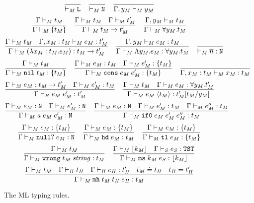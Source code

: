\begin{figure}[p]
\caption{The ML typing rules.}
\[
\frac
{}
{ \vdash_{\mathit{M}} \mathtt{L}}
\quad
\frac
{}
{ \vdash_{\mathit{M}} \mathtt{N}}
\quad
\frac
{}
{\Gamma , y_{\mathit{M}} \vdash_{\mathit{M}} y_{\mathit{M}}}
\]
\[
\frac
{\Gamma \vdash_{\mathit{M}} t_{\mathit{M}}}
{\Gamma \vdash_{\mathit{M}} \lbrace t_{\mathit{M}} \rbrace}
\quad
\frac
{\Gamma \vdash_{\mathit{M}} t_{\mathit{M}} \quad \Gamma \vdash_{\mathit{M}} t_{\mathit{M}}'}
{\Gamma \vdash_{\mathit{M}} t_{\mathit{M}} \rightarrow t_{\mathit{M}}'}
\quad
\frac
{\Gamma, y_{\mathit{M}} \vdash_{\mathit{M}} t_{\mathit{M}}}
{\Gamma \vdash_{\mathit{M}} \forall y_{\mathit{M}} . t_{\mathit{M}}}
\]
\bigskip
\[
\frac
{\Gamma \vdash_{\mathit{M}} t_{\mathit{M}} \quad \Gamma , x_{\mathit{M}} : t_{\mathit{M}} \vdash_{\mathit{M}} e_{\mathit{M}} : t_{\mathit{M}}'}
{\Gamma \vdash_{\mathit{M}} (\lambda x_{\mathit{M}} : t_{\mathit{M}} . e_{\mathit{M}}) : t_{\mathit{M}} \rightarrow t_{\mathit{M}}'}
\quad
\frac
{\Gamma , y_{\mathit{M}} \vdash_{\mathit{M}} e_{\mathit{M}} : t_{\mathit{M}}}
{\Gamma \vdash_{\mathit{M}} \Lambda y_{\mathit{M}} . e_{\mathit{M}} : \forall y_{\mathit{M}} . t_{\mathit{M}}}
\quad
\frac
{}
{ \vdash_{\mathit{M}} \overline{n} : \mathtt{N}}
\]
\[
\frac
{\Gamma \vdash_{\mathit{M}} t_{\mathit{M}}}
{\Gamma \vdash_{\mathit{M}} \mathtt{nil} \; t_{\mathit{M}} : \lbrace t_{\mathit{M}} \rbrace}
\quad
\frac
{\Gamma \vdash_{\mathit{M}} e_{\mathit{M}} : t_{\mathit{M}} \quad \Gamma \vdash_{\mathit{M}} e_{\mathit{M}}' : \lbrace t_{\mathit{M}} \rbrace}
{\Gamma \vdash_{\mathit{M}} \mathtt{cons} \; e_{\mathit{M}} \; e_{\mathit{M}}' : \lbrace t_{\mathit{M}} \rbrace}
\quad
\frac
{}
{\Gamma , x_{\mathit{M}} : t_{\mathit{M}} \vdash_{\mathit{M}} x_{\mathit{M}} : t_{\mathit{M}}}
\]
\[
\frac
{\Gamma \vdash_{\mathit{M}} e_{\mathit{M}} : t_{\mathit{M}} \rightarrow t_{\mathit{M}}' \quad \Gamma \vdash_{\mathit{M}} e_{\mathit{M}}' : t_{\mathit{M}}}
{\Gamma\vdash_{\mathit{H}}e_{\mathit{M}} \; e_{\mathit{M}}':t_{\mathit{M}}'}
\quad
\frac
{\Gamma \vdash_{\mathit{M}} t_{\mathit{M}} \quad \Gamma \vdash_{\mathit{M}} e_{\mathit{M}} : \forall y_{\mathit{M}} . t_{\mathit{M}}'}
{\Gamma \vdash_{\mathit{M}} e_{\mathit{M}} \; \langle t_{\mathit{M}} \rangle : t_{\mathit{M}}'[t_{\mathit{M}}/y_{\mathit{M}}]}
\]
\[
\frac
{\Gamma \vdash_{\mathit{M}} e_{\mathit{M}} : \mathtt{N} \quad \Gamma \vdash_{\mathit{M}} e_{\mathit{M}}' : \mathtt{N}}
{\Gamma \vdash_{\mathit{M}} \mathit{a} \; e_{\mathit{M}} \; e_{\mathit{M}}' : \mathtt{N}}
\quad
\frac
{\Gamma \vdash_{\mathit{M}} e_{\mathit{M}} : \mathtt{N} \quad \Gamma \vdash_{\mathit{M}} e_{\mathit{M}}' : t_{\mathit{M}} \quad \Gamma \vdash_{\mathit{M}} e_{\mathit{M}}'' : t_{\mathit{M}}}
{\Gamma \vdash_{\mathit{M}} \mathtt{if0} \; e_{\mathit{M}} \; e_{\mathit{M}}' \; e_{\mathit{M}}'' : t_{\mathit{M}}}
\]
\[
\frac
{\Gamma \vdash_{\mathit{M}} e_{\mathit{M}} : \lbrace t_{\mathit{M}} \rbrace}
{\Gamma \vdash_{\mathit{M}} \mathtt{null?} \; e_{\mathit{M}} : \mathtt{N}}
\quad
\frac
{\Gamma \vdash_{\mathit{M}} e_{\mathit{M}} : \lbrace t_{\mathit{M}} \rbrace}
{\Gamma \vdash_{\mathit{M}} \mathtt{hd} \; e_{\mathit{M}} : t_{\mathit{M}}}
\quad
\frac
{\Gamma \vdash_{\mathit{M}} e_{\mathit{M}} : \lbrace t_{\mathit{M}} \rbrace}
{\Gamma \vdash_{\mathit{M}} \mathtt{tl} \; e_{\mathit{M}} : \lbrace t_{\mathit{M}} \rbrace}
\]
\[
\frac
{\Gamma \vdash_{\mathit{M}} t_{\mathit{M}}}
{\Gamma \vdash_{\mathit{M}} \mathtt{wrong} \; t_{\mathit{M}} \; \mathit{string} : t_{\mathit{M}}}
\quad
\frac
{\Gamma \vdash_{\mathit{M}} \lfloor k_{\mathit{M}} \rfloor \quad \Gamma \vdash_{\mathit{S}} e_{\mathit{S}} : \mathtt{TST}}
{\Gamma \vdash_{\mathit{M}} \mathtt{ms} \; k_{\mathit{M}} \; e_{\mathit{S}} : \lfloor k_{\mathit{M}} \rfloor}
\]
\[
\frac
{\Gamma \vdash_{\mathit{M}} t_{\mathit{M}} \quad \Gamma \vdash_{\mathit{H}} t_{\mathit{H}} \quad \Gamma \vdash_{\mathit{H}} e_{\mathit{H}} : t_{\mathit{H}}' \quad t_{\mathit{M}} \doteq t_{\mathit{H}} \quad t_{\mathit{H}} = t_{\mathit{H}}'}
{\Gamma \vdash_{\mathit{M}} \mathtt{mh} \; t_{\mathit{M}} \; t_{\mathit{H}} \; e_{\mathit{H}} : t_{\mathit{M}}}
\]
\label{figmtr}
\end{figure}